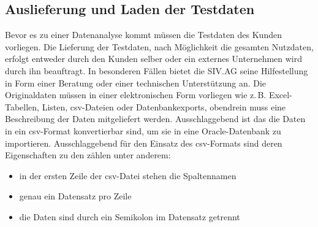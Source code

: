 \subsection*{Auslieferung und Laden der Testdaten}
Bevor es zu einer Datenanalyse kommt müssen die Testdaten des Kunden vorliegen. Die Lieferung der Testdaten, nach Möglichkeit die gesamten Nutzdaten, erfolgt entweder durch den Kunden selber oder ein externes Unternehmen wird durch ihn beauftragt. In besonderen Fällen bietet die SIV.AG seine Hilfestellung in Form einer Beratung oder einer technischen Unterstützung an. Die Originaldaten müssen in einer elektronischen Form vorliegen wie z.\,B. Excel-Tabellen, Listen, \acrfull{csv}-Dateien oder Datenbankexports, obendrein muss eine Beschreibung der Daten mitgeliefert werden. Ausschlaggebend ist das die Daten in ein \acrshort{csv}-Format konvertierbar sind, um sie in eine Oracle-Datenbank zu importieren.
Ausschlaggebend für den Einsatz des \acrshort{csv}-Formats sind deren Eigenschaften zu den zählen unter anderem:
\begin{itemize}
  \item in der ersten Zeile der \acrshort{csv}-Datei stehen die Spaltennamen
  \item genau ein Datensatz pro Zeile 
  \item die Daten sind durch ein Semikolon im Datensatz getrennt
\end{itemize}
